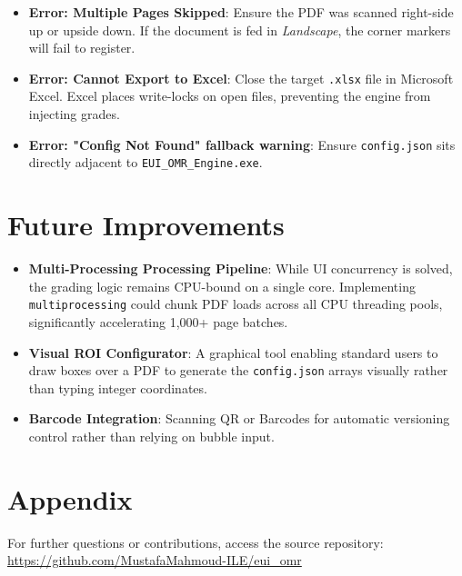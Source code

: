 \documentclass[12pt,a4paper]{article}
\begin{document}
\begin{itemize}
    \item \textbf{Error: Multiple Pages Skipped}: Ensure the PDF was scanned right-side up or upside down. If the document is fed in \textit{Landscape}, the corner markers will fail to register.
    \item \textbf{Error: Cannot Export to Excel}: Close the target \texttt{.xlsx} file in Microsoft Excel. Excel places write-locks on open files, preventing the engine from injecting grades.
    \item \textbf{Error: "Config Not Found" fallback warning}: Ensure \texttt{config.json} sits directly adjacent to \texttt{EUI\_OMR\_Engine.exe}.
\end{itemize}

\section{Future Improvements}
\begin{itemize}
    \item \textbf{Multi-Processing Processing Pipeline}: While UI concurrency is solved, the grading logic remains CPU-bound on a single core. Implementing \texttt{multiprocessing} could chunk PDF loads across all CPU threading pools, significantly accelerating 1,000+ page batches.
    \item \textbf{Visual ROI Configurator}: A graphical tool enabling standard users to draw boxes over a PDF to generate the \texttt{config.json} arrays visually rather than typing integer coordinates.
    \item \textbf{Barcode Integration}: Scanning QR or Barcodes for automatic versioning control rather than relying on bubble input.
\end{itemize}

\section{Appendix}
For further questions or contributions, access the source repository: \\
\url{https://github.com/MustafaMahmoud-ILE/eui_omr}
\end{document}
